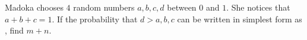Madoka chooses $4$ random numbers $a, b, c, d$ between $0$ and $1$. She notices that $a+b+c = 1$.
If the probability that $d > a, b, c$ can be written in simplest form as , find $m + n$.